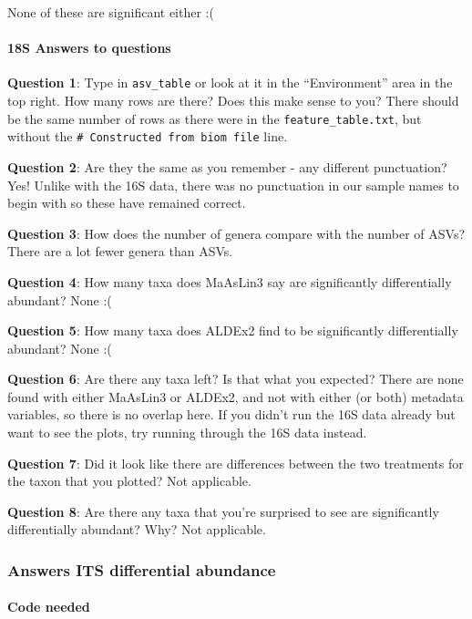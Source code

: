 \documentclass[
]{book}
\begin{document}
None of these are significant either :(

\paragraph{18S Answers to questions}\label{s-answers-to-questions}

\textbf{Question 1}: Type in \texttt{asv\_table} or look at it in the ``Environment'' area in the top right. How many rows are there? Does this make sense to you?
There should be the same number of rows as there were in the \texttt{feature\_table.txt}, but without the \texttt{\#\ Constructed\ from\ biom\ file} line.

\textbf{Question 2}: Are they the same as you remember - any different punctuation?
Yes! Unlike with the 16S data, there was no punctuation in our sample names to begin with so these have remained correct.

\textbf{Question 3}: How does the number of genera compare with the number of ASVs?
There are a lot fewer genera than ASVs.

\textbf{Question 4}: How many taxa does MaAsLin3 say are significantly differentially abundant?
None :(

\textbf{Question 5}: How many taxa does ALDEx2 find to be significantly differentially abundant?
None :(

\textbf{Question 6}: Are there any taxa left? Is that what you expected?
There are none found with either MaAsLin3 or ALDEx2, and not with either (or both) metadata variables, so there is no overlap here. If you didn't run the 16S data already but want to see the plots, try running through the 16S data instead.

\textbf{Question 7}: Did it look like there are differences between the two treatments for the taxon that you plotted?
Not applicable.

\textbf{Question 8}: Are there any taxa that you're surprised to see are significantly differentially abundant? Why?
Not applicable.

\subsubsection{Answers ITS differential abundance}\label{answers-its-differential-abundance}

\paragraph{Code needed}\label{code-needed-1}
\end{document}
